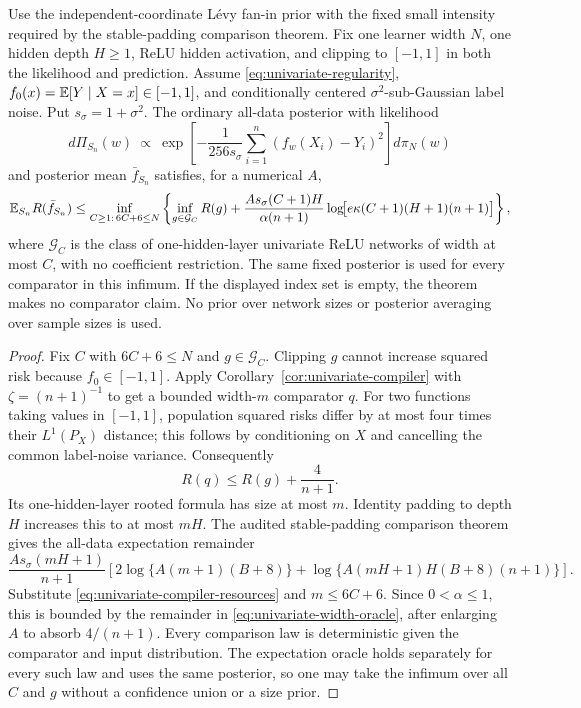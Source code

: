 \begin{theorem}
\label{thm:univariate-levy-oracle}
Use the independent-coordinate L\'evy fan-in prior with the fixed small
intensity required by the stable-padding comparison theorem. Fix one
learner width $N$, one hidden depth $H\ge1$, ReLU hidden activation,
and clipping to $[-1,1]$ in both the likelihood and prediction.
Assume \eqref{eq:univariate-regularity},
$f_0(x)=\mathbb E[Y\mid X=x]\in[-1,1]$, and conditionally centered
$\sigma^2$-sub-Gaussian label noise. Put $s_\sigma=1+\sigma^2$.
The ordinary all-data posterior with likelihood
\[
 d\Pi_{S_n}(w)\ \propto\
 \exp\!\left[-\frac1{256s_\sigma}
          \sum_{i=1}^n(f_w(X_i)-Y_i)^2\right]d\pi_N(w)
\]
and posterior mean $\bar f_{S_n}$ satisfies, for a numerical $A$,
\begin{equation}
 \mathbb E_{S_n}R(\bar f_{S_n})
 \le
 \inf_{\substack{C\ge1:\,6C+6\le N}}
 \left\{\inf_{g\in\mathcal G_C}R(g)
 +\frac{A s_\sigma(C+1)H}{\alpha(n+1)}
       \log\!\bigl[e\kappa(C+1)(H+1)(n+1)\bigr]\right\},
 \label{eq:univariate-width-oracle}
\end{equation}
where $\mathcal G_C$ is the class of one-hidden-layer univariate ReLU
networks of width at most $C$, with no coefficient restriction. The
same fixed posterior is used for every comparator in this infimum.
If the displayed index set is empty, the theorem makes no comparator
claim. No prior over network sizes or posterior averaging over sample
sizes is used.
\end{theorem}
\begin{proof}
Fix $C$ with $6C+6\le N$ and $g\in\mathcal G_C$.
Clipping $g$ cannot increase squared risk because $f_0\in[-1,1]$.
Apply Corollary~\ref{cor:univariate-compiler} with
$\zeta=(n+1)^{-1}$ to get a bounded width-$m$ comparator $q$.
For two functions taking values in $[-1,1]$, population squared risks
differ by at most four times their $L^1(P_X)$ distance; this follows
by conditioning on $X$ and cancelling the common label-noise variance.
Consequently
\[
 R(q)\le R(g)+\frac4{n+1}.
\]
Its one-hidden-layer rooted formula has size at most $m$. Identity
padding to depth $H$ increases this to at most $mH$. The audited
stable-padding comparison theorem gives the all-data expectation
remainder
\[
 \frac{A s_\sigma(mH+1)}{n+1}
 \left[2\log\{A(m+1)(B+8)\}
       +\log\{A(mH+1)H(B+8)(n+1)\}\right].
\]
Substitute \eqref{eq:univariate-compiler-resources} and
$m\le6C+6$. Since $0<\alpha\le1$, this is bounded by the remainder
in \eqref{eq:univariate-width-oracle}, after enlarging $A$ to absorb
$4/(n+1)$. Every comparison law is deterministic given the comparator
and input distribution. The expectation oracle holds separately for
every such law and uses the same posterior, so one may take the
infimum over all $C$ and $g$ without a confidence union or a size prior.
\end{proof}

